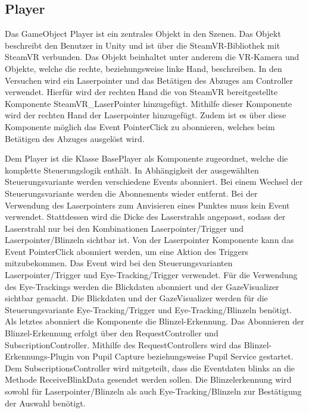 \subsection{Player}
Das GameObject \glqq Player\grqq{} ist ein zentrales Objekt in den Szenen. Das Objekt beschreibt den Benutzer in Unity und ist über die SteamVR-Bibliothek mit SteamVR verbunden. Das Objekt beinhaltet unter anderem die VR-Kamera und Objekte, welche die rechte, beziehungsweise linke Hand, beschreiben. In den Versuchen wird ein Laserpointer und das Betätigen des Abzuges am Controller verwendet. Hierfür wird der rechten Hand die von SteamVR bereitgestellte Komponente {\ttfamily SteamVR\_LaserPointer} hinzugefügt. Mithilfe dieser Komponente wird der rechten Hand der Laserpointer hinzugefügt. Zudem ist es über diese Komponente möglich das Event PointerClick zu abonnieren, welches beim Betätigen des Abzuges ausgelöst wird. 

Dem Player ist die Klasse {\ttfamily BasePlayer} als Komponente zugeordnet, welche die komplette Steuerungslogik enthält. In Abhängigkeit der ausgewählten Steuerungsvariante werden verschiedene Events abonniert. Bei einem Wechsel der Steuerungsvariante werden die Abonnements wieder entfernt. Bei der Verwendung des Laserpointers zum Anvisieren eines Punktes muss kein Event verwendet. Stattdessen wird die Dicke des Laserstrahls angepasst, sodass der Laserstrahl nur bei den Kombinationen Laserpointer/Trigger und Laserpointer/Blinzeln sichtbar ist. Von der Laserpointer Komponente kann das Event PointerClick abonniert werden, um eine Aktion des Triggers mitzubekommen. Das Event wird bei den Steuerungsvarianten Laserpointer/Trigger und Eye-Tracking/Trigger verwendet. Für die Verwendung des Eye-Trackings werden die Blickdaten abonniert und der GazeVisualizer sichtbar gemacht. Die Blickdaten und der GazeVisualizer werden für die Steuerungsvariante Eye-Tracking/Trigger und Eye-Tracking/Blinzeln benötigt. Als letztes abonniert die Komponente die Blinzel-Erkennung. Das Abonnieren der Blinzel-Erkennung erfolgt über den RequestController und SubscriptionController. Mithilfe des RequestControllers wird das Blinzel-Erkennungs-Plugin von Pupil Capture beziehungsweise Pupil Service gestartet. Dem SubscriptionsController wird mitgeteilt, dass die Eventdaten \glqq blinks\grqq{} an die Methode ReceiveBlinkData gesendet werden sollen. Die Blinzelerkennung wird sowohl für Laserpointer/Blinzeln als auch Eye-Tracking/Blinzeln zur Bestätigung der Auswahl benötigt.


